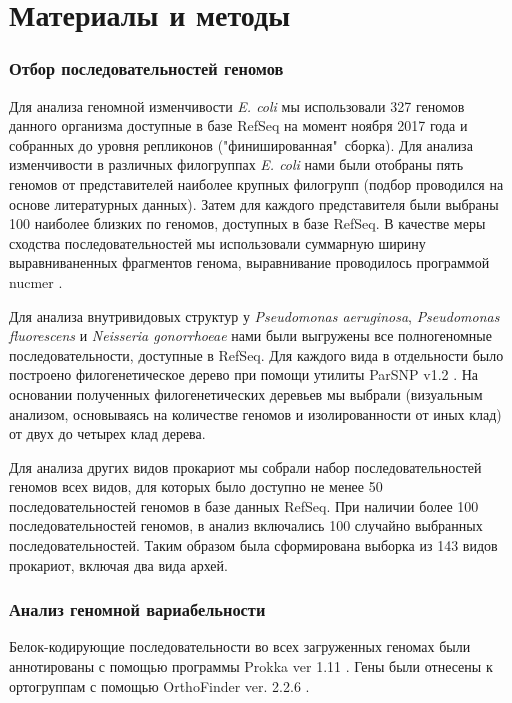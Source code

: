 \chapter{Материалы и методы}
\subsection{Отбор последовательностей геномов}
Для анализа геномной изменчивости \textit{E. coli} мы использовали 327 геномов данного организма доступные в базе RefSeq на момент ноября 2017 года и собранных до уровня репликонов ("финишированная"\ сборка). Для анализа изменчивости в различных филогруппах \textit{E. coli} нами были отобраны пять геномов от представителей наиболее крупных филогрупп (подбор проводился на основе литературных данных). Затем для каждого представителя были выбраны 100 наиболее близких по геномов, доступных в базе RefSeq. В качестве меры сходства последовательностей мы использовали суммарную ширину выравниваненных фрагментов генома, выравнивание проводилось программой nucmer \cite{marccais2018mummer4}. 

Для анализа внутривидовых структур у \textit{Pseudomonas aeruginosa}, \textit{Pseudomonas fluorescens} и \textit{Neisseria gonorrhoeae} нами были выгружены все полногеномные последовательности, доступные в RefSeq. Для каждого вида в отдельности было построено филогенетическое дерево при помощи утилиты ParSNP v1.2 \cite{treangen2014harvest}. На основании полученных филогенетических деревьев мы выбрали (визуальным анализом, основываясь на количестве геномов и изолированности от иных клад) от двух до четырех клад дерева. 

Для анализа других видов прокариот мы собрали набор последовательностей геномов всех видов, для которых было доступно не менее 50 последовательностей геномов в базе данных RefSeq. При наличии более 100 последовательностей геномов, в анализ включались 100 случайно выбранных последовательностей. Таким образом была сформирована выборка из 143 видов прокариот, включая два вида архей.

\subsection{Анализ геномной вариабельности}
Белок-кодирующие последовательности во всех загруженных геномах были аннотированы с помощью программы Prokka ver 1.11 \cite{seemann2014prokka}. Гены были отнесены к ортогруппам с помощью OrthoFinder ver. 2.2.6 \cite{emms2015orthofinder}. 

